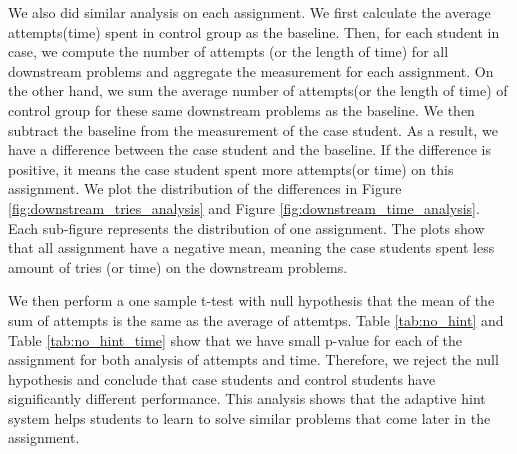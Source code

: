 \documentclass{sigchi/sigchi}
\begin{document}
We also did similar analysis on each assignment. We first calculate the average attempts(time) spent in control group as the baseline. Then, for each student in case, we compute the number of attempts (or the length of time) for all downstream problems and aggregate the measurement for each assignment. On the other hand, we sum the average number of attempts(or the length of time) of control group for these same downstream problems as the baseline. We then subtract the baseline from the measurement of the case student. As a result, we have a difference between the case student and the baseline. If the difference is positive, it means the case student spent more attempts(or time) on this assignment. We plot the distribution of the differences in Figure \ref{fig:downstream_tries_analysis} and Figure \ref{fig:downstream_time_analysis}. Each sub-figure represents the distribution of one assignment. The plots show that all assignment have a negative mean, meaning the case students spent less amount of tries (or time) on the downstream problems.

We then perform a one sample t-test with null hypothesis that the mean of the sum of attempts is the same as the average of attemtps. Table \ref{tab:no_hint} and Table \ref{tab:no_hint_time} show that we have small p-value for each of the assignment for both analysis of attempts and time. Therefore, we reject the null hypothesis and conclude that case students and control students have significantly different performance. This analysis shows that the adaptive hint system helps students to learn to solve similar problems that come later in the assignment. 


\begin{table}[th]
\caption{The table listed the extra number of attempts that control students spent comparing to case students. For the each of the four weeks, the control students spent more attempts than the case students. We also perform a one sample t-test with the null hypothesis that control students should have the same amount of attempts on problems as case students. The final p-value of the one sample t-test for all assignments is small enough that we can reject the null hypothesis.}
\begin{center}
  \label{tab:no_hint}
  \end{center}
\end{table}
\end{document}
